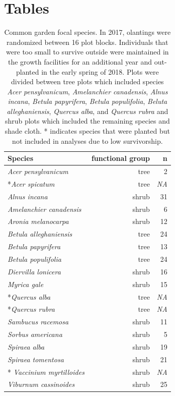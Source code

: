 \documentclass{article}[11pt]
\begin{document}


\section{Tables}
\begin{table}[ht]
\centering

\label{listSp}
\begin{tabular}{lrr}
  \hline
Species & functional group & n \\ 
  \hline
  \emph{Acer pensylvanicum} & tree  & 2 \\ 
  *\emph{Acer spicatum} & tree & \emph{NA}  \\ 
   \emph{Alnus incana} & shrub & 31 \\ 
   \emph{Amelanchier canadensis} &  shrub & 6  \\ 
  \emph{Aronia melanocarpa} & shrub & 12 \\ 
  \emph{Betula alleghaniensis} &  tree & 24\\ 
  \emph{Betula papyrifera} &   tree & 13 \\ 
  \emph{Betula populifolia} &  tree & 24\\ 
  \emph{Diervilla lonicera} &  shrub  & 16 \\ 
  \emph{Myrica gale} &  shrub & 15\\ 
  *\emph{Quercus alba} &  tree & \emph{NA}\\ 
  *\emph{Quercus rubra} &  tree & \emph{NA}\\ 
  \emph{Sambucus racemosa} &  shrub & 11\\ 
  \emph{Sorbus americana} &  shrub & 5\\
  \emph{Spiraea alba} &  shrub & 19\\ 
  \emph{Spiraea tomentosa} &   shrub & 21 \\ 
 * \emph{Vaccinium myrtilloides} &  shrub & \emph{NA}\\ 
  \emph{Viburnum cassinoides} &  shrub & 25 \\ 
  \end{tabular}
  \caption{Common garden focal species. In 2017, olantings were randomized between 16 plot blocks. Individuals that were too small to survive outside were maintained in the growth facilities for an additional year and out-planted in the early spring of 2018. Plots were divided between tree plots which included species  \textit{Acer pensylvanicum}, \textit{Amelanchier canadensis}, \textit{Alnus incana}, \textit{Betula papyrifera}, \textit{Betula populifolia}, \textit{Beluta alleghaniensis}, \textit{Quercus alba}, and \textit{Quercus rubra} and shrub plots which included the remaining species and shade cloth. * indicates species that were planted but not included in analyses due to low survivorship.} 
\end{table}
\end{document}

